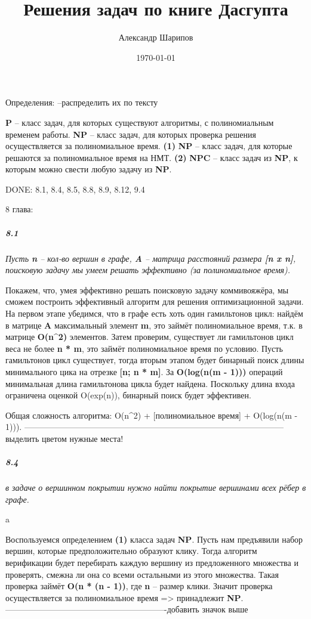 \documentclass{article}
\title{Решения задач по книге Дасгупта}
\author{Александр Шарипов}
\date{\today}
\begin{document}
\maketitle
\newpage
{}

Определения:
--распределить их по тексту

\textbf{P} -- класс задач, для которых существуют алгоритмы, с полиномиальным временем работы.
\textbf{NP} -- класс задач, для которых проверка решения осуществляется за полиномиальное время. \textbf{(1)}
\textbf{NP} -- класс задач, для которые решаются за полиномиальное время на НМТ. \textbf{(2)}
\textbf{NPC} -- класс задач из \textbf{NP}, к которым можно свести любую задачу из \textbf{NP}.

DONE: 8.1, 8.4, 8.5, 8.8, 8.9, 8.12, 9.4

8 глава:

\subparagraph{8.1}

\textit{Пусть \textbf{n} -- кол-во вершин в графе, \textbf{A} -- матрица расстояний размера \textbf{[n x n]}, поисковую задачу мы умеем решать эффективно (за полиномиальное время).}

Покажем, что, умея эффективно решать поисковую задачу коммивояжёра, мы сможем построить эффективный алгоритм для решения оптимизационной задачи. На первом этапе убедимся, что в графе есть хоть один гамильтонов цикл: найдём в матрице \textbf{A} максимальный элемент \textbf{m}, это займёт полиномиальное время, т.к. в матрице \textbf{O(n^2)} элементов. Затем проверим, существует ли гамильтонов цикл веса не более \textbf{n * m}, это займёт полиномиальное время по условию. Пусть гамильтонов цикл существует, тогда вторым этапом будет бинарный поиск длины минимального цика на отрезке \textbf{[n; n * m]}. За \textbf{O(log(n(m - 1)))} операций минимальная длина гамильтонова цикла будет найдена. Поскольку длина входа ограничена оценкой O(exp(n)), бинарный поиск будет эффективен.

Общая сложность алгоритма: O(n^2) + [полиномиальное время] + O(log(n(m - 1))).
---------------------------------------------------------------------------------------------выделить цветом нужные места!

\subparagraph{8.4}

\textit{в задаче о вершинном покрытии нужно найти покрытие вершинами всех рёбер в графе.}

a

Воспользуемся определением \textbf{(1)} класса задач \textbf{NP}. Пусть нам предъявили набор вершин, которые предположительно образуют клику. Тогда алгоритм верификации будет перебирать каждую вершину из предложенного множества и проверять, смежна ли она со всеми остальными из этого множества. Такая проверка займёт \textbf{O(n * (n - 1))}, где \textbf{n} -- размер клики. Значит проверка осуществляется за полиномиальное время => принадлежит \textbf{NP}.
----------------------------------------------------------добавить значок выше
\end{document}
